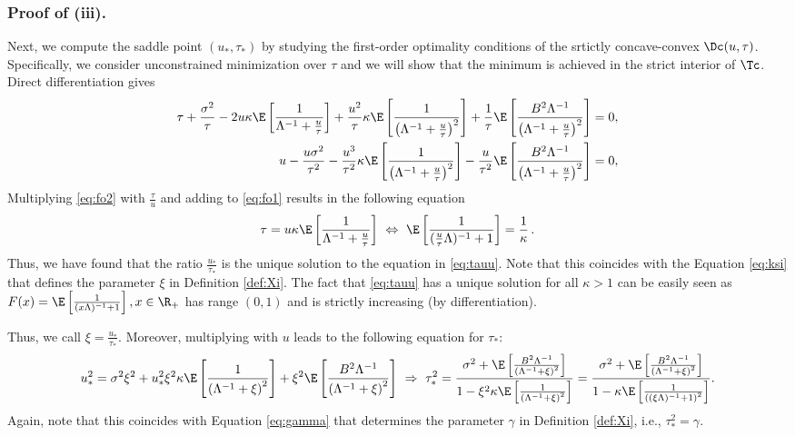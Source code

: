 \subsubsection{Proof of (iii).}  Next, we compute the saddle point $(u_*,\tau_*)$ by studying the first-order optimality conditions of the srtictly concave-convex $\Dc(u,\tau)$. Specifically, we consider unconstrained minimization over $\tau$ and we will show that the minimum is achieved in the strict interior of $\Tc$. Direct differentiation gives
\begin{subequations}
\begin{align}
{\tau} + \frac{\sigma^2}{\tau} - 2u\kappa\E\left[ \frac{1}{\Lambda^{-1}+\frac{u}{\tau}} \right] + \frac{u^2}{\tau}\kappa \E\left[ \frac{1}{\left(\Lambda^{-1}+\frac{u}{\tau}\right)^2}\right] + \frac{1}{\tau}\E\left[\frac{B^2\Lambda^{-1}}{\left(\Lambda^{-1}+\frac{u}{\tau}\right)^2}\right] &= 0, \label{eq:fo1}\\
{u} - \frac{u\sigma^2}{\tau^2} - \frac{u^3}{\tau^2}\kappa \E\left[ \frac{1}{\left(\Lambda^{-1} + \frac{u}{\tau}\right)^2}\right] - \frac{u}{\tau^2} \E\left[\frac{B^2\Lambda^{-1}}{\left(\Lambda^{-1}+\frac{u}{\tau}\right)^2}\right] &= 0,\label{eq:fo2}
\end{align}
\end{subequations}
Multiplying \eqref{eq:fo2}  with $\frac{\tau}{u}$ and adding to \eqref{eq:fo1} results in the following equation
\begin{align}
\tau = u\kappa\E\left[ \frac{1}{\Lambda^{-1}+\frac{u}{\tau}} \right] ~\Leftrightarrow ~
\E\left[ \frac{1}{(\frac{u}{\tau}\Lambda)^{-1}+1} \right] = \frac{1}{\kappa} \label{eq:tauu}\,.
\end{align}
Thus, we have found that the ratio $\frac{u_*}{\tau_*}$ is the unique solution to the equation in \eqref{eq:tauu}. Note that this coincides with the Equation \eqref{eq:ksi} that defines the parameter $\xi$ in Definition \ref{def:Xi}.  The fact that \eqref{eq:tauu} has a unique solution for all $\kappa>1$ can be easily seen as $F(x)=\E\left[ \frac{1}{(x\Lambda)^{-1}+1} \right], x\in\R_+$ has range $(0,1)$ and is strictly increasing (by differentiation). 


Thus, we call $\xi=\frac{u_*}{\tau_*}$. Moreover, multiplying \label{eq:fo2} with $u$ leads to the following equation for $\tau_*$:
\begin{align}
u_*^2 = \sigma^2\xi^2 + u_*^2 \xi^2  \kappa \E\left[ \frac{1}{\left(\Lambda^{-1} +\xi\right)^2}\right] + \xi^2  \E\left[ \frac{B^2\Lambda^{-1}}{\left(\Lambda^{-1} + \xi\right)^2}\right] ~\Rightarrow~ \tau_*^2 = \frac{\sigma^2 + \E\left[ \frac{B^2\Lambda^{-1}}{\left(\Lambda^{-1} + \xi\right)^2}\right]}{1-\xi^2\kappa \E\left[ \frac{1}{\left(\Lambda^{-1} +\xi\right)^2}\right]} =  \frac{\sigma^2 + \E\left[ \frac{B^2\Lambda^{-1}}{\left(\Lambda^{-1} + \xi\right)^2}\right]}{1-\kappa \E\left[ \frac{1}{\left((\xi\Lambda)^{-1} +1\right)^2}\right]}.
\end{align}
{Again, note that this coincides with Equation \eqref{eq:gamma} that determines the parameter $\gamma$ in Definition \ref{def:Xi}, i.e., $\tau_*^2 = \gamma.$ }

